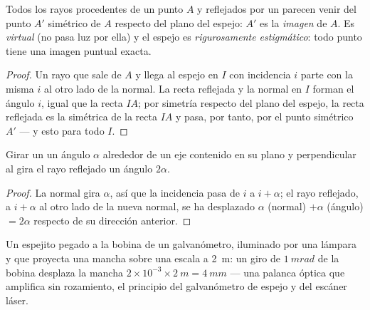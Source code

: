 \begin{proposition}\label{prop:b1:rays-reflection-refraction:mirror}
Todos los rayos procedentes de un punto $A$ y reflejados por un  parecen venir del punto $A'$ simétrico de $A$ respecto del plano del
espejo: $A'$ es la \emph{imagen} de $A$. Es \emph{virtual} (no pasa luz
por ella) y el espejo es \emph{rigurosamente estigmático}: todo punto
tiene una imagen puntual exacta.
\end{proposition}

\begin{proof}
Un rayo que sale de $A$ y llega al espejo en $I$ con incidencia $i$ parte
con la misma $i$ al otro lado de la normal. La recta reflejada y la normal
en $I$ forman el ángulo $i$, igual que la recta $IA$; por simetría
respecto del plano del espejo, la recta reflejada es la simétrica de la
recta $IA$ y pasa, por tanto, por el punto simétrico $A'$ --- y esto para
todo $I$.
\end{proof}

\begin{proposition}\label{prop:b1:rays-reflection-refraction:rotation}
Girar un  un ángulo $\alpha$ alrededor de un eje contenido en
su plano y perpendicular al  gira el rayo reflejado un
ángulo $2\alpha$.
\end{proposition}

\begin{proof}
La normal gira $\alpha$, así que la incidencia pasa de $i$ a
$i + \alpha$; el rayo reflejado, a $i + \alpha$ al otro lado de la nueva
normal, se ha desplazado $\alpha$ (normal) $+ \alpha$ (ángulo) $=
2\alpha$ respecto de su dirección anterior.
\end{proof}

\begin{example}\label{ex:b1:rays-reflection-refraction:galvanometer}
Un espejito pegado a la bobina de un galvanómetro, iluminado por una
lámpara y que proyecta una mancha sobre una escala a \qty{2}{m}: un giro
de $\qty{1}{mrad}$ de la bobina desplaza la mancha $2 \times 10^{-3} \times
\qty{2}{m} = \qty{4}{mm}$ --- una palanca óptica que amplifica sin
rozamiento, el principio del galvanómetro de espejo y del escáner láser.
\end{example}

